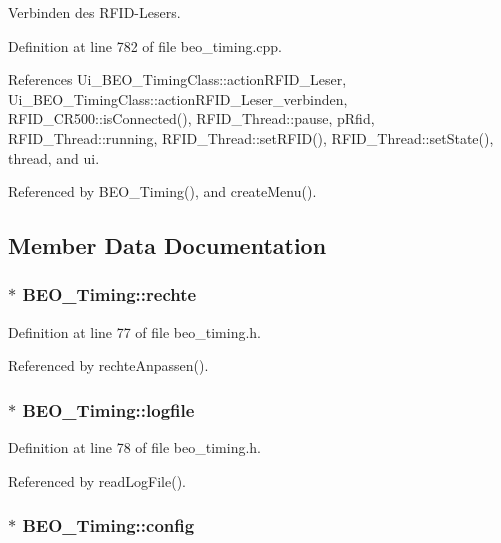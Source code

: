 Verbinden des RFID-Lesers. 



Definition at line 782 of file beo\_\-timing.cpp.

References Ui\_\-BEO\_\-TimingClass::actionRFID\_\-Leser, Ui\_\-BEO\_\-TimingClass::actionRFID\_\-Leser\_\-verbinden, RFID\_\-CR500::isConnected(), RFID\_\-Thread::pause, pRfid, RFID\_\-Thread::running, RFID\_\-Thread::setRFID(), RFID\_\-Thread::setState(), thread, and ui.

Referenced by BEO\_\-Timing(), and createMenu().

\subsection{Member Data Documentation}
\hypertarget{class_b_e_o___timing_19f749ab5e005801517ec98286a89596}{
\subsubsection[rechte]{$\ast$ {\bf BEO\_\-Timing::rechte}}}
\label{class_b_e_o___timing_19f749ab5e005801517ec98286a89596}




Definition at line 77 of file beo\_\-timing.h.

Referenced by rechteAnpassen().\hypertarget{class_b_e_o___timing_b8cfb6b1d41a21e54498a183eef54651}{
\subsubsection[logfile]{$\ast$ {\bf BEO\_\-Timing::logfile}}}
\label{class_b_e_o___timing_b8cfb6b1d41a21e54498a183eef54651}




Definition at line 78 of file beo\_\-timing.h.

Referenced by readLogFile().\hypertarget{class_b_e_o___timing_8abbf93b70915e725738223a587cb42d}{
\subsubsection[config]{$\ast$ {\bf BEO\_\-Timing::config}}}
\label{class_b_e_o___timing_8abbf93b70915e725738223a587cb42d}




